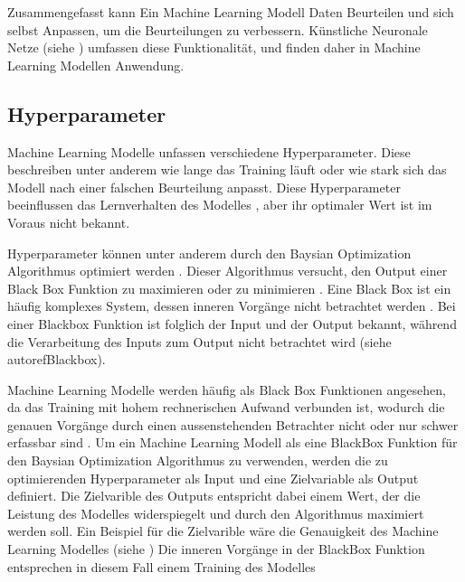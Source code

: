 Zusammengefasst kann Ein Machine Learning Modell Daten Beurteilen und sich
selbst Anpassen, um die Beurteilungen zu verbessern. Künstliche Neuronale Netze
(siehe ) umfassen diese Funktionalität, und finden daher in
Machine Learning Modellen Anwendung.


\subsection{Hyperparameter}\label{sub:t_ml_hyper}
Machine Learning Modelle unfassen verschiedene Hyperparameter. Diese beschreiben
unter anderem wie lange das Training läuft oder wie stark sich das Modell nach
einer falschen Beurteilung anpasst. Diese Hyperparameter beeinflussen das
Lernverhalten des Modelles \cite{nyuytiymbiy_parameters_2022}, aber ihr optimaler Wert ist im
Voraus nicht bekannt.

Hyperparameter können unter anderem durch den Baysian Optimization Algorithmus
optimiert werden
\cite{agnihotri_exploring_2020}\cite{paretos_bayesian_2021}.
Dieser Algorithmus versucht, den Output einer Black Box Funktion zu maximieren
oder zu minimieren \cite[S. 15]{garnett_bayesian_nodate}. Eine Black Box ist ein häufig komplexes
System, dessen inneren Vorgänge nicht betrachtet werden \cite{noauthor_black_2021}.
Bei einer Blackbox Funktion ist folglich der Input und der Output bekannt,
während die Verarbeitung des Inputs zum Output nicht betrachtet wird (siehe
autoref{Blackbox}). %


Machine Learning Modelle werden häufig als Black Box Funktionen angesehen, da
das Training mit hohem rechnerischen Aufwand verbunden ist, wodurch die genauen
Vorgänge durch einen aussenstehenden Betrachter nicht oder nur schwer erfassbar
sind \cite{robbins_machine_2017}. Um ein Machine Learning Modell als eine BlackBox Funktion für
den Baysian Optimization Algorithmus zu verwenden, werden die zu optimierenden
Hyperparameter als Input und eine Zielvariable als Output definiert. Die
Zielvarible des Outputs entspricht dabei einem Wert, der die Leistung des
Modelles widerspiegelt und durch den Algorithmus maximiert werden soll. Ein
Beispiel für die Zielvarible wäre die Genauigkeit des Machine Learning Modelles
(siehe ) Die inneren Vorgänge in der BlackBox Funktion
entsprechen in diesem Fall einem Training des Modelles

